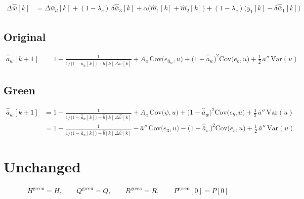 \documentclass[11pt,a4paper,fontset=none]{ctexart}
\newcommand{\ba}{\bar{a}}
\newcommand{\bw}{\bar{w}}
\newcommand{\dWh}{\Delta\hat{\bw}}
\newcommand{\app}{\ba''}
\newcommand{\ah}{\hat{\ba}_w}
\newcommand{\bh}{\hat{b}}
\newcommand{\ea}{e_{\ba_w}}
\newcommand{\Cov}{\mathrm{Cov}}
\newcommand{\Var}{\mathrm{Var}}
\begin{document}
\begin{align*}
\dWh[k] &= \Delta\bw_d[k] + (1-\lambda_c)\,\delta\hat{\bw}_3[k] + \alpha\bigl(\hat m_1[k] + \hat m_2[k]\bigr)
           + (1-\lambda_c)\bigl(y_1[k] - \delta\hat{\bw}_1[k]\bigr)
\end{align*}

\subsection*{Original}

\begin{align*}
\ah[k+1] &= 1 - \frac{1}{1/\bigl(1-\ah[k]\bigr) + \bh[k]\,\dWh[k]}
            + A_a\,\Cov\bigl(\ea, u\bigr) + \bigl(1-\ah\bigr)^{2}\Cov\bigl(e_b, u\bigr) + \tfrac{1}{2}\,\app\,\Var(u)
\end{align*}

\subsection*{Green}

\begin{align*}
\ah[k+1] &= 1 - \frac{1}{1/\bigl(1-\ah[k]\bigr) + \bh[k]\,\dWh[k]}
            + A_a\,\Cov\bigl(\psi, u\bigr) + \bigl(1-\ah\bigr)^{2}\Cov\bigl(e_b, u\bigr) + \tfrac{1}{2}\,\app\,\Var(u) \\
         &= 1 - \frac{1}{1/\bigl(1-\ah[k]\bigr) + \bh[k]\,\dWh[k]}
            - \app\,\Cov\bigl(e_3, u\bigr) - \bigl(1-\ah\bigr)^{2}\Cov\bigl(e_b, u\bigr) + \tfrac{1}{2}\,\app\,\Var(u)
\end{align*}

\section{Unchanged}

\begin{align*}
H^{\mathrm{green}} = H, \qquad Q^{\mathrm{green}} = Q, \qquad R^{\mathrm{green}} = R, \qquad P^{\mathrm{green}}[0] = P[0]
\end{align*}
\end{document}
